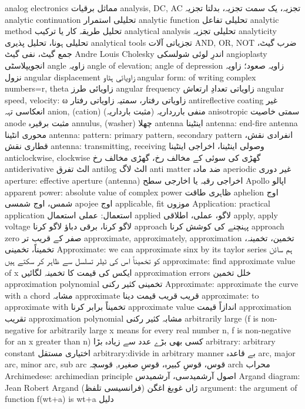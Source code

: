 analog electronics	مماثل برقیات
analysis, DC, AC	تجزیہ، یک سمت تجزیہ، بدلتا تجزیہ
analytic continuation	تحلیلی استمرار
analytic function	تحلیلی تفاعل
analytic method	تحلیل طریقہ کار یا ترکیب
analytical analysis	تحلیلی تجزیہ
analyticity	تحلیلی ہونا، تحلیل پذیری
analytical tools	تجزیاتی آلات
AND, OR, NOT	ضرب گیٹ، جمع گیٹ، نفی گیٹ
Andre Louis Cholesky	اندرِ لوئی شولسکی
angioplasty	انجویپلاسٹی
angle	زاویہ
angle of elevation; angle of depression	زاویہ صعود؛ زاویہ نزول
angular displacement	زاویائی ہٹاو
angular form: of writing complex numbers=r, theta	زاویائی طرز
angular frequency	زاویاتی تعدادِ ارتعاش
angular speed, velocity: ω	زاویاتی رفتار، سمتیہ زاویاتی رفتار
antireflective coating	غیر انعکاسی تہہ
anion, (cation)	منفی باررداریہ (مثبت بارداریہ)
anisotropic	سمتی خاصیت
anode	مثبت برقیرہ
annulus, (washer)	چھلا
antenna	اینٹینا
antenna: end-fire antenna	محوری انٹینا
antenna: pattern: primary pattern, secondary pattern	انفرادی نقش، قطاری نقش
antenna: transmitting, receiving	وصولی اینٹینا، اخراجی اینٹینا
anticlockwise, clockwise	گھڑی کی سوئی کے مخالف رخ، گھڑی مخالف رخ
antiderivative	الٹ تفرق
antilog	الٹ لاگ
anti matter	ضد مادہ
aperiodic	غیر دوری
aperture: effective aperture (antenna)	اخراجی رقبہ یا اخارجی سطح
Apollo	اپالو
apparent power: absolute value of complex power	ظاہری طاقت
aphelion	اوج شمس، اوج شمسی
apojee	اوج
applicable, fit	موزوں
Application: practical application	استعمال: عملی استعمال
applied	لاگو، عملی، اطلاقی
apply, apply voltage	لاگو کرنا، برقی دباؤ لاگو کرنا
approach	پہنچنے کی کوشش کرنا
approach zero	صفر کے قریب تر
approximate, approximately, approximation	تخمین، تخمینہ، تخمیناً، تخمینی
Approximate: we can approximate sinx by its taylor series	ہم سائن کو تخمیناً اس کی ٹیلر تسلسل سے ظاہر کر سکتے ہیں
approximate: find approximate value of x	ایکس کی قیمت کا تخمینہ لگائیں
approximation errors	خلل تخمین
approximation polynomial	تخمینی کثیر رکنی
Approximate: approximate the curve with a chord	مشابہ
approximate	قریب قریب قیمت دینا
approximate: to approximate with	تخمیناً برابر کرنا
approximate value	اندازاً قیمت
approximation	تقریب
approximation polynomial	مشابہ کثیر رکنی
arbitrarily large (f is non-negative for arbitrarily large x means for every real number n, f is non-negative for an x greater than n)	کسی بھی بڑے عدد سے زیادہ بڑا
arbitrary: arbitrary constant	اختیاری مستقل
arbitrary:divide in arbitrary manner	بے قاعدہ
arc, major arc, minor arc, sub arc	قوس، قوسِ کبیرہ، قوسِ صغیرہ, قوسچہ
arch	محراب
Archimedese: archimedian principle	اصول آرشمیدسی، آرشمیدس
Argand diagram: Jean Robert Argand	ژاں غوبغ اغگن  (فرانسیسی تلفظ)
argument: the argument of function f(wt+a) is wt+a	دلیل
